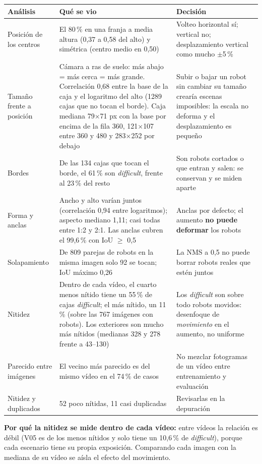 \documentclass[11pt,a4paper]{article}
\begin{document}
\begin{longtable}{@{}P{3.1cm}P{6cm}P{5.4cm}@{}}
\toprule
\textbf{Análisis} & \textbf{Qué se vio} & \textbf{Decisión} \\
\midrule
\endhead
Posición de los centros & El 80\,\% en una franja a media altura (0,37 a 0,58 del alto) y simétrica (centro medio en 0,50) & Volteo horizontal sí; vertical no; desplazamiento vertical como mucho $\pm$5\,\% \\
Tamaño frente a posición & Cámara a ras de suelo: más abajo = más cerca = más grande. Correlación 0,68 entre la base de la caja y el logaritmo del alto (1289 cajas que no tocan el borde). Caja mediana 79$\times$71 px con la base por encima de la fila 360, 121$\times$107 entre 360 y 480 y 283$\times$252 por debajo & Subir o bajar un robot sin cambiar su tamaño crearía escenas imposibles: la escala no deforma y el desplazamiento es pequeño \\
Bordes & De las 134 cajas que tocan el borde, el 61\,\% son \emph{difficult}, frente al 23\,\% del resto & Son robots cortados o que entran y salen: se conservan y se miden aparte \\
Forma y anclas & Ancho y alto varían juntos (correlación 0,94 entre logaritmos); aspecto mediano 1,11; casi todas entre 1:2 y 2:1. Las anclas cubren el 99,6\,\% con IoU $\ge$ 0,5 & Anclas por defecto; el aumento \textbf{no puede deformar} los robots \\
Solapamiento & De 809 parejas de robots en la misma imagen solo 92 se tocan; IoU máximo 0,26 & La NMS a 0,5 no puede borrar robots reales que estén juntos \\
Nitidez & Dentro de cada vídeo, el cuarto menos nítido tiene un 55\,\% de cajas \emph{difficult}; el más nítido, un 11\,\% (sobre las 767 imágenes con robots). Los exteriores son mucho más nítidos (medianas 328 y 278 frente a 43--130) & Los \emph{difficult} son sobre todo robots movidos: desenfoque de \emph{movimiento} en el aumento, no uniforme \\
Parecido entre imágenes & El vecino más parecido es del mismo vídeo en el 74\,\% de casos & No mezclar fotogramas de un vídeo entre entrenamiento y evaluación \\
Nitidez y duplicados & 52 poco nítidas, 11 casi duplicadas & Revisarlas en la depuración \\
\bottomrule
\end{longtable}

\textbf{Por qué la nitidez se mide dentro de cada vídeo:} entre vídeos la relación es débil (V05 es de los menos nítidos y solo tiene un 10,6\,\% de \emph{difficult}), porque cada escenario tiene su propia exposición. Comparando cada imagen con la mediana de su vídeo se aísla el efecto del movimiento.
\end{document}
